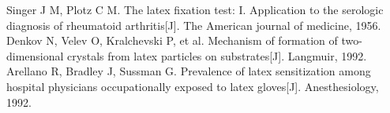 \begin{thebibliography}{99}
 Singer J M, Plotz C M. The latex fixation test: I. Application to the serologic diagnosis of rheumatoid arthritis[J]. The American journal of medicine, 1956.
 Denkov N, Velev O, Kralchevski P, et al. Mechanism of formation of two-dimensional crystals from latex particles on substrates[J]. Langmuir, 1992.
 Arellano R, Bradley J, Sussman G. Prevalence of latex sensitization among hospital physicians occupationally exposed to latex gloves[J]. Anesthesiology, 1992.
\end{thebibliography}
